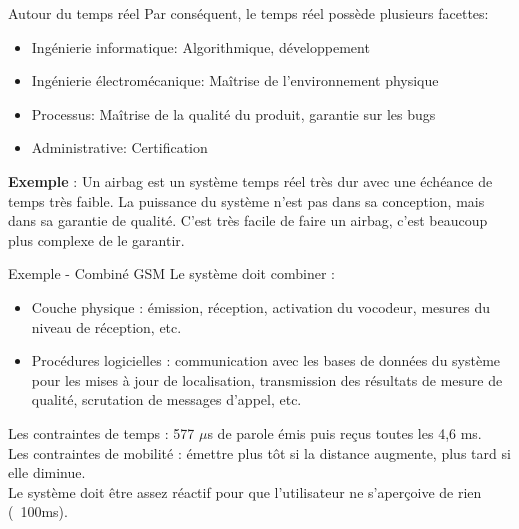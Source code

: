 \begin{frame}{Autour du temps réel}
  Par conséquent, le temps réel possède plusieurs facettes:
  \begin{itemize}
  \item Ingénierie informatique: Algorithmique, développement
  \item  Ingénierie   électromécanique:  Maîtrise  de  l'environnement
    physique
  \item Processus: Maîtrise de la qualité du produit, garantie sur les
    bugs
  \item Administrative: Certification
  \end{itemize}
  \textbf{Exemple} : Un airbag est un système temps réel très dur avec
  une échéance de temps très faible. La puissance du système n'est pas
  dans sa  conception, mais dans  sa garantie de qualité.   C'est très
  facile  de faire  un  airbag,  c'est beaucoup  plus  complexe de  le
  garantir.
\end{frame}


\begin{frame}{Exemple - Combiné GSM}
  Le système doit combiner :
  \begin{itemize}
  \item Couche physique : émission, réception, activation du vocodeur,
    mesures du niveau de réception, etc.
  \item  Procédures  logicielles  :  communication avec  les  bases  de
    données  du  système  pour  les  mises  à  jour  de  localisation,
    transmission  des résultats  de mesure  de qualité,  scrutation de
    messages d'appel, etc.
  \end{itemize}

  Les  contraintes de temps  : 577  $\mu$s de  parole émis  puis reçus
  toutes les  4,6 ms.\\[3mm]

  Les  contraintes de  mobilité  :  émettre plus  tôt  si la  distance
  augmente,  plus tard si elle diminue.\\[3mm]

  Le  système  doit  être  assez  réactif pour  que  l'utilisateur  ne
  s'aperçoive de rien (~100ms).

\end{frame}


